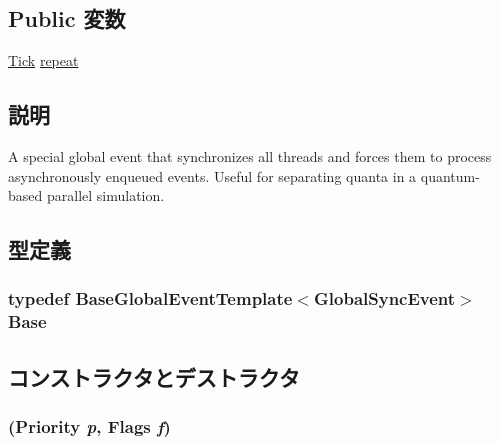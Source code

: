 \subsection*{Public 変数}
\begin{DoxyCompactItemize}
\item 
\hyperlink{base_2types_8hh_a5c8ed81b7d238c9083e1037ba6d61643}{Tick} \hyperlink{classGlobalSyncEvent_a186e97c430ff343e8ab14129eaa8375d}{repeat}
\end{DoxyCompactItemize}


\subsection{説明}
A special global event that synchronizes all threads and forces them to process asynchronously enqueued events. Useful for separating quanta in a quantum-\/based parallel simulation. 

\subsection{型定義}
\hypertarget{classGlobalSyncEvent_ad39529d6bdef8a3698085739963cfbec}{
\subsubsection[{Base}]{\setlength{\rightskip}{0pt plus 5cm}typedef {\bf BaseGlobalEventTemplate}$<${\bf GlobalSyncEvent}$>$ {\bf Base}}}
\label{classGlobalSyncEvent_ad39529d6bdef8a3698085739963cfbec}


\subsection{コンストラクタとデストラクタ}
\hypertarget{classGlobalSyncEvent_a408a501bdc8b56cd2903f78f337135ee}{
\subsubsection[{GlobalSyncEvent}]{ ({\bf Priority} {\em p}, \/  {\bf Flags} {\em f})}}
\label{classGlobalSyncEvent_a408a501bdc8b56cd2903f78f337135ee}



